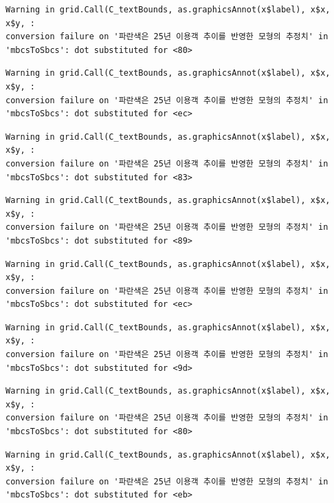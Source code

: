 \documentclass[
  letterpaper,
  DIV=11,
  numbers=noendperiod]{scrreprt}
\begin{document}
\begin{verbatim}
Warning in grid.Call(C_textBounds, as.graphicsAnnot(x$label), x$x, x$y, :
conversion failure on '파란색은 25년 이용객 추이를 반영한 모형의 추정치' in
'mbcsToSbcs': dot substituted for <80>
\end{verbatim}

\begin{verbatim}
Warning in grid.Call(C_textBounds, as.graphicsAnnot(x$label), x$x, x$y, :
conversion failure on '파란색은 25년 이용객 추이를 반영한 모형의 추정치' in
'mbcsToSbcs': dot substituted for <ec>
\end{verbatim}

\begin{verbatim}
Warning in grid.Call(C_textBounds, as.graphicsAnnot(x$label), x$x, x$y, :
conversion failure on '파란색은 25년 이용객 추이를 반영한 모형의 추정치' in
'mbcsToSbcs': dot substituted for <83>
\end{verbatim}

\begin{verbatim}
Warning in grid.Call(C_textBounds, as.graphicsAnnot(x$label), x$x, x$y, :
conversion failure on '파란색은 25년 이용객 추이를 반영한 모형의 추정치' in
'mbcsToSbcs': dot substituted for <89>
\end{verbatim}

\begin{verbatim}
Warning in grid.Call(C_textBounds, as.graphicsAnnot(x$label), x$x, x$y, :
conversion failure on '파란색은 25년 이용객 추이를 반영한 모형의 추정치' in
'mbcsToSbcs': dot substituted for <ec>
\end{verbatim}

\begin{verbatim}
Warning in grid.Call(C_textBounds, as.graphicsAnnot(x$label), x$x, x$y, :
conversion failure on '파란색은 25년 이용객 추이를 반영한 모형의 추정치' in
'mbcsToSbcs': dot substituted for <9d>
\end{verbatim}

\begin{verbatim}
Warning in grid.Call(C_textBounds, as.graphicsAnnot(x$label), x$x, x$y, :
conversion failure on '파란색은 25년 이용객 추이를 반영한 모형의 추정치' in
'mbcsToSbcs': dot substituted for <80>
\end{verbatim}

\begin{verbatim}
Warning in grid.Call(C_textBounds, as.graphicsAnnot(x$label), x$x, x$y, :
conversion failure on '파란색은 25년 이용객 추이를 반영한 모형의 추정치' in
'mbcsToSbcs': dot substituted for <eb>
\end{verbatim}
\end{document}
